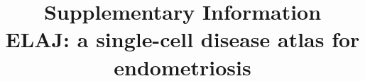 \documentclass[11pt, a4paper]{article}
\title{\vspace{-2em}\textbf{Supplementary Information}\\[0.3em]
\large ELAJ: a single-cell disease atlas for endometriosis}
\date{}
\renewcommand{\thesection}{Supplementary Note \arabic{section}}
\begin{document}
\maketitle
\vspace{-2em}

\tableofcontents

\listoffigures
\listoftables
\newpage

%
\clearpage
\clearpage
\clearpage
\clearpage
\clearpage
\clearpage

\clearpage
\clearpage
\clearpage

%

\renewcommand{\refname}{Supplementary references}

\end{document}
